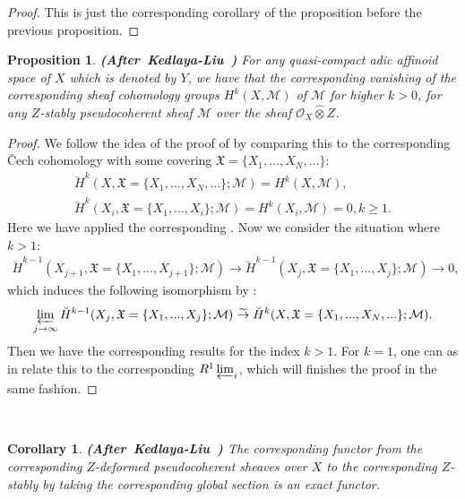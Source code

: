 \documentclass[12pt]{amsart}
\newtheorem{proposition}[theorem]{Proposition}
\newtheorem{corollary}[theorem]{Corollary}
\theoremstyle{definition}
\numberwithin{equation}{section}
\begin{document}
\begin{proof}
This is just the corresponding corollary of the proposition before the previous proposition.	
\end{proof}


\begin{proposition}  \mbox{\bf{(After Kedlaya-Liu \cite[Theorem 2.6.5]{KL2})}} \label{proposition6.28}
For any quasi-compact adic affinoid space of $X$ which is denoted by $Y$, we have that the corresponding vanishing of the corresponding sheaf cohomology groups $H^k(X,\mathcal{M})$ of $\mathcal{M}$ for higher $k>0$, for any $Z$-stably pseudocoherent sheaf $\mathcal{M}$ over the sheaf $\mathcal{O}_X\widehat{\otimes}Z$.	
\end{proposition}


\begin{proof}
We follow the idea of the proof of \cite[Theorem 2.6.5]{KL2} by comparing this to the corresponding \v{C}ech cohomology with some covering $\mathfrak{X}=\{X_1,...,X_N,...\}$:
\begin{align}
\breve{H}^k(X,\mathfrak{X}=\{X_1,...,X_N,...\};\mathcal{M})=H^k(X,\mathcal{M}),\\
\breve{H}^k(X_i,\mathfrak{X}=\{X_1,...,X_i\};\mathcal{M})=H^k(X_i,\mathcal{M})=0,k\geq 1.
\end{align}
Here we have applied the corresponding \cite[Tag 01EW]{SP}. Now we consider the situation where $k>1$:
\begin{align}
\breve{H}^{k-1}(X_{j+1},\mathfrak{X}=\{X_1,...,X_{j+1}\};\mathcal{M})	\rightarrow \breve{H}^{k-1}(X_j,\mathfrak{X}=\{X_1,...,X_{j}\};\mathcal{M})\rightarrow 0,
\end{align}
which induces the following isomorphism by \cite[2.6 Hilfssatz]{Kie1}:
\begin{align}
\varprojlim_{j\rightarrow \infty} \breve{H}^{k-1}(X_j,\mathfrak{X}=\{X_1,...,X_{j}\};\mathcal{M})	\overset{\sim}{\rightarrow} \breve{H}^k(X,\mathfrak{X}=\{X_1,...,X_N,...\};\mathcal{M}). 
\end{align}
Then we have the corresponding results for the index $k>1$. For $k=1$, one can as in \cite[Theorem 2.6.5]{KL2} relate this to the corresponding $R^1\varprojlim_i$, which will finishes the proof in the same fashion.
\end{proof}

\

\begin{corollary}  \mbox{\bf{(After Kedlaya-Liu \cite[Corollary 2.6.6]{KL2})}}
The corresponding functor from the corresponding $Z$-deformed pseudocoherent sheaves over $X$ to the corresponding $Z$-stably by taking the corresponding global section is an exact functor.
\end{corollary}
\end{document}
